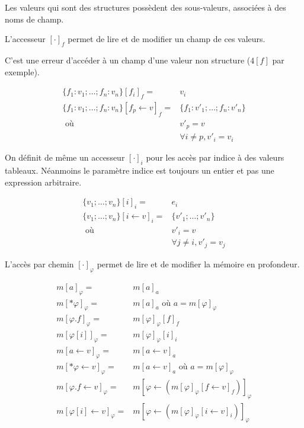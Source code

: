 \begin{definition}

  Les valeurs qui sont des structures possèdent des sous-valeurs, associées à
  des noms de champ.

  L'accesseur $[ \cdot ]_f$ permet de lire et de modifier un champ de ces
  valeurs.

  C'est une erreur d'accéder à un champ d'une valeur non structure ($4[f]$ par
  exemple).

  \begin{align*}
    \{ f_1 : v_1; … ; f_n : v_n \}[f_i]_f = & v_i \\
    \{ f_1 : v_1; … ; f_n : v_n \}[f_p ← v]_f = & \{ f_1 : v'_1; … ; f_n : v'_n \} \\
          \mbox{ où } & v'_p = v \\
                      & ∀ i ≠ p, v'_i = v_i
  \end{align*}

\end{definition}

\begin{definition}

  On définit de même un accesseur $[\cdot]_i$ pour les accès par indice à des
  valeurs tableaux. Néanmoins le paramètre indice est toujours un entier et pas
  une expression arbitraire.

  \begin{align*}
    \{ v_1 ; … ; v_n \} [i]_i   = & e_i \\
    \{ v_1 ; … ; v_n \} [i←v]_i = & \{ v'_1 ; … ; v'_n \} \\
                      \mbox{ où } & v'_i = v \\
                                  & ∀j≠i, v'_j = v_j
  \end{align*}

\end{definition}

\begin{definition}

  L'accès par chemin $[\cdot]_φ$ permet de lire et de modifier la mémoire en
  profondeur.

  \begin{align*}
    m[a]_φ        = & m[a]_a \\
    m[*φ]_φ       = & m[a]_a \mbox{ où } a = m[φ]_φ \\
    m[φ.f]_φ      = & m[φ]_φ[f]_f \\
    m[φ[i]]_φ     = & m[φ]_φ[i]_i \\
    m[a ← v]_φ    = & m[a ← v]_a \\
    m[*φ ← v]_φ   = & m[a ← v]_a \mbox{ où } a = m[φ]_φ \\
    m[φ.f ← v]_φ  = & m[φ ← (m[φ]_φ[f←v]_f)]_φ \\
    m[φ[i] ← v]_φ = & m[φ ← (m[φ]_φ[i←v]_i)]_φ
  \end{align*}

\end{definition}

